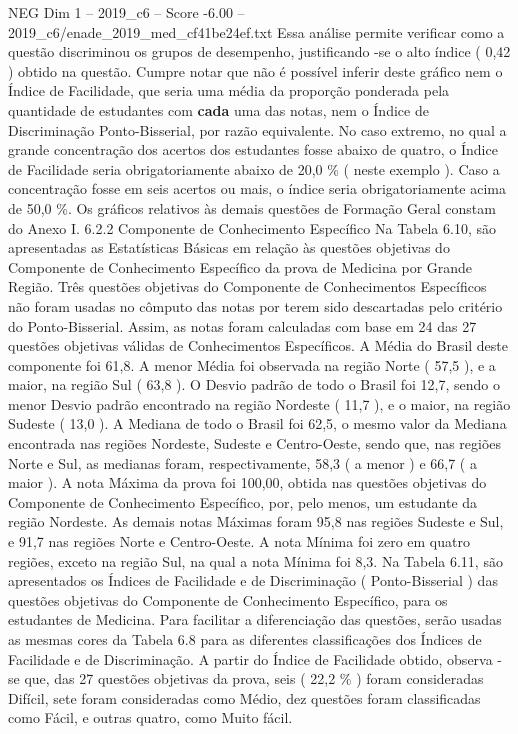 \begin{textsample}{NEG Dim 1 – 2019\_c6 – Score -6.00 – 2019\_c6/enade\_2019\_med\_cf41be24ef.txt}
Essa análise permite verificar como a questão discriminou os grupos de desempenho, justificando -se o alto índice ( 0,42 ) obtido na questão.
Cumpre notar que não é possível inferir deste gráfico nem o Índice de Facilidade, que seria uma média da proporção ponderada pela quantidade de estudantes com \textbf{cada} uma das notas, nem o Índice de Discriminação Ponto-Bisserial, por razão equivalente.
No caso extremo, no qual a grande concentração dos acertos dos estudantes fosse abaixo de quatro, o Índice de Facilidade seria obrigatoriamente abaixo de 20,0 \% ( neste exemplo ).
Caso a concentração fosse em seis acertos ou mais, o índice seria obrigatoriamente acima de 50,0 \%.
Os gráficos relativos às demais questões de Formação Geral constam do Anexo I. 6.2.2 Componente de Conhecimento Específico Na Tabela 6.10, são apresentadas as Estatísticas Básicas em relação às questões objetivas do Componente de Conhecimento Específico da prova de Medicina por Grande Região.
Três questões objetivas do Componente de Conhecimentos Específicos não foram usadas no cômputo das notas por terem sido descartadas pelo critério do Ponto-Bisserial.
Assim, as notas foram calculadas com base em 24 das 27 questões objetivas válidas de Conhecimentos Específicos.
A Média do Brasil deste componente foi 61,8.
A menor Média foi observada na região Norte ( 57,5 ), e a maior, na região Sul ( 63,8 ).
O Desvio padrão de todo o Brasil foi 12,7, sendo o menor Desvio padrão encontrado na região Nordeste ( 11,7 ), e o maior, na região Sudeste ( 13,0 ).
A Mediana de todo o Brasil foi 62,5, o mesmo valor da Mediana encontrada nas regiões Nordeste, Sudeste e Centro-Oeste, sendo que, nas regiões Norte e Sul, as medianas foram, respectivamente, 58,3 ( a menor ) e 66,7 ( a maior ).
A nota Máxima da prova foi 100,00, obtida nas questões objetivas do Componente de Conhecimento Específico, por, pelo menos, um estudante da região Nordeste.
As demais notas Máximas foram 95,8 nas regiões Sudeste e Sul, e 91,7 nas regiões Norte e Centro-Oeste.
A nota Mínima foi zero em quatro regiões, exceto na região Sul, na qual a nota Mínima foi 8,3.
Na Tabela 6.11, são apresentados os Índices de Facilidade e de Discriminação ( Ponto-Bisserial ) das questões objetivas do Componente de Conhecimento Específico, para os estudantes de Medicina.
Para facilitar a diferenciação das questões, serão usadas as mesmas cores da Tabela 6.8 para as diferentes classificações dos Índices de Facilidade e de Discriminação.
A partir do Índice de Facilidade obtido, observa -se que, das 27 questões objetivas da prova, seis ( 22,2 \% ) foram consideradas Difícil, sete foram consideradas como Médio, dez questões foram classificadas como Fácil, e outras quatro, como Muito fácil.

\end{textsample}
